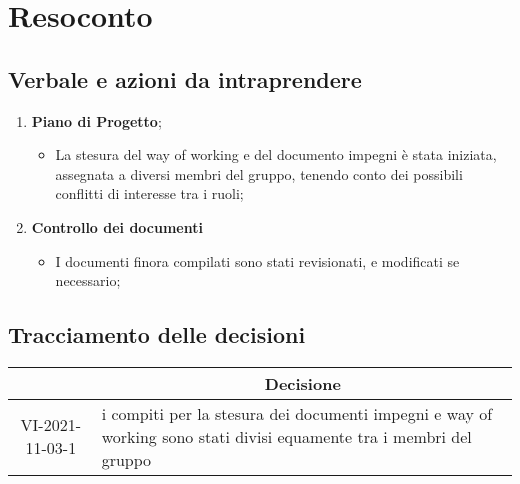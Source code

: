 \section{Resoconto}
\subsection{Verbale e azioni da intraprendere}

\begin{enumerate}
	\item \textbf{Piano di Progetto};
	\begin{itemize}
		\item La stesura del way of working e del documento impegni è stata iniziata, assegnata a diversi membri del gruppo, tenendo conto dei possibili conflitti di interesse tra i ruoli;
	\end{itemize}
	\item \textbf{Controllo dei documenti}
	\begin{itemize}
		\item I documenti finora compilati sono stati revisionati, e modificati se necessario;
	\end{itemize}
\end{enumerate}

\pagebreak

\subsection{Tracciamento delle decisioni}

\begin{table}[H]
	\centering
	\renewcommand{\arraystretch}{1.8}
	\begin{tabular}{c | p{10cm}}
		\rowcolor[HTML]{125E28}
		\multicolumn{1}{c}{\color[HTML]{FFFFFF} \textbf{ID}} &
		\multicolumn{1}{c}{\color[HTML]{FFFFFF} \textbf{Decisione}} \\
		\hline
		VI-2021-11-03-1 & i compiti per la stesura dei documenti impegni e way of working sono stati divisi equamente tra i membri del gruppo  \\ \hline
	\end{tabular}
\end{table}
